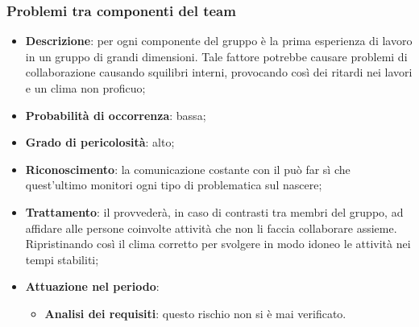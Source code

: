 		\subsubsection{Problemi tra componenti del team}
		\begin{itemize}
			\item \textbf{Descrizione}: per ogni componente del gruppo è la prima esperienza di lavoro in un gruppo di grandi dimensioni. Tale fattore potrebbe causare problemi di collaborazione causando squilibri interni, provocando così dei ritardi nei lavori e un clima non proficuo; 
			\item \textbf{Probabilità di occorrenza}: bassa;
			\item \textbf{Grado di pericolosità}: alto;
			\item \textbf{Riconoscimento}: la comunicazione costante con il \textit{\Res} può far sì che quest'ultimo monitori ogni tipo di problematica sul nascere;  
			\item \textbf{Trattamento}: il \textit{\Res} provvederà, in caso di contrasti tra membri del gruppo, ad affidare alle persone coinvolte attività che non li faccia collaborare assieme. Ripristinando così il clima corretto per svolgere in modo idoneo le attività nei tempi stabiliti;
			\item \textbf{Attuazione nel periodo}:
			\begin{itemize}
				\item \textbf{Analisi dei requisiti}: questo rischio non si è mai verificato.
			\end{itemize}
		\end{itemize}
		
